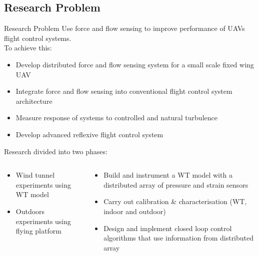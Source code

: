 \documentclass[aspectratio=169]{beamer}            %
\begin{document}
\subsection{Research Problem}
\begin{frame}{Research Problem}
  Use force and flow sensing to improve performance of UAVs flight control systems.\\
  \pause
  To achieve this:
  \begin{itemize}
    \item<3-> Develop distributed force and flow sensing system for a small scale fixed wing UAV
    \item<4-> Integrate force and flow sensing into conventional flight control system architecture
    \item<5-> Measure response of systems to controlled and natural turbulence
    \item<6-> Develop advanced reflexive flight control system
  \end{itemize}
\end{frame}

\begin{frame}{}

  Research divided into two phases:
  \begin{columns}
    \begin{column}{0.5\textwidth}
      \vspace{-0.5cm}
      \begin{itemize}
	\item<2->Wind tunnel experiments using WT model
	\item<3->Outdoors experiments using flying platform
      \end{itemize}
    \end{column}
    \begin{column}{0.5\textwidth}
      \begin{itemize}
	\item<4->[-]Build and instrument a WT model with a distributed array of pressure and strain sensors
	\item<4->[-]Carry out calibration \& characterisation (WT, indoor and outdoor)
	\item<4->[-]Design and implement closed loop control algorithms that use information from distributed array
      \end{itemize} 
    \end{column}
  \end{columns}
  
\end{frame}
\end{document}
